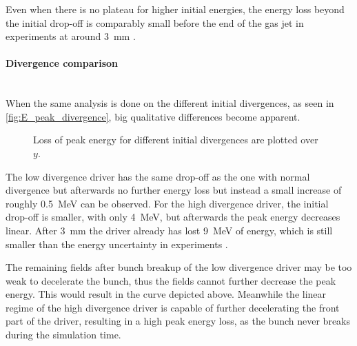 \documentclass[bachelor_thesis]{subfiles}
\begin{document}
Even when there is no plateau for higher initial energies, the energy loss beyond the initial drop-off is comparably small before the end of the gas jet in experiments at around \qty{3}{\mm} \cite{Schoebel2022}.

\paragraph*{Divergence comparison}\hspace{0pt} \\
When the same analysis is done on the different initial divergences, as seen in \autoref{fig:E_peak_divergence}, big qualitative differences become apparent. 
\begin{figure}
	\centering
	
	\caption{Loss of peak energy for different initial divergences are plotted over $y$.}
	\label{fig:E_peak_divergence}
\end{figure}
The low divergence driver has the same drop-off as the one with normal divergence but afterwards no further energy loss but instead a small increase of roughly \qty{0.5}{\MeV} can be observed.
For the high divergence driver, the initial drop-off is smaller, with only \qty{4}{\MeV}, but afterwards the peak energy decreases linear. After \qty{3}{\mm} the driver already has lost \qty{9}{\MeV} of energy, which is still smaller than the energy uncertainty in experiments \cite{Schoebel2022}.

The remaining fields after bunch breakup of the low divergence driver may be too weak to decelerate the bunch, thus the fields cannot further decrease the peak energy. This would result in the curve depicted above. 
Meanwhile the linear regime of the high divergence driver is capable of further decelerating the front part of the driver, resulting in a high peak energy loss, as the bunch never breaks during the simulation time. 
\end{document}
